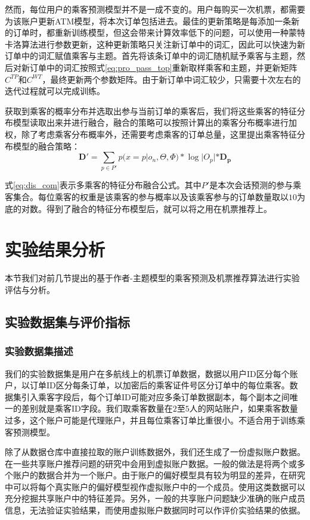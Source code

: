 然而，每位用户的乘客预测模型并不是一成不变的。用户每购买一次机票，都需要为该账户更新ATM模型，将本次订单包括进去。最佳的更新策略是每添加一条新的订单时，都重新训练模型，但这会带来计算效率低下的问题，可以使用一种蒙特卡洛算法进行参数更新，这种更新策略只关注新订单中的词汇，因此可以快速为新订单中的词汇赋值乘客与主题。首先将该条订单中的词汇随机赋予乘客与主题，然后对新订单中的词汇按照式\ref{eq:pro_pass_top}重新取样乘客和主题，并更新矩阵$C^{TP}$和$C^{WT}$，最终更新两个参数矩阵。由于新订单中词汇较少，只需要十次左右的迭代过程就可以完成训练。

获取到乘客的概率分布并选取出参与当前订单的乘客后，我们将这些乘客的特征分布模型读取出来并进行融合，融合的策略可以按照计算出的乘客分布概率进行加权，除了考虑乘客分布概率外，还需要考虑乘客的订单总量，这里提出乘客特征分布模型的融合策略：
\begin{equation}
	\label{eq:dis_com}
	\mathbf{D'} = \sum_{p \in P'} p(x = p|o_n,\Theta,\Phi) * \log |O_p| * \mathbf{D_p}
\end{equation}

式\ref{eq:dis_com}表示多乘客的特征分布融合公式。其中$P'$是本次会话预测的参与乘客集合。每位乘客的权重是该乘客的参与概率以及该乘客参与的订单数量取以$10$为底的对数。得到了融合的特征分布模型后，就可以将之用在机票推荐上。

\section{实验结果分析}

本节我们对前几节提出的基于作者-主题模型的乘客预测及机票推荐算法进行实验评估与分析。

\subsection{实验数据集与评价指标}

\subsubsection{实验数据集描述}
我们的实验数据集是用户在多航线上的机票订单数据，数据以用户ID区分每个账户，以订单ID区分每条订单，以加密后的乘客证件号区分订单中的每位乘客。数据集引入乘客字段后，每个订单ID可能对应多条订单数据副本，每个副本之间唯一的差别就是乘客ID字段。我们取乘客数量在$2$至$5$人的网站账户，如果乘客数量过多，这个账户可能是代理账户，并且每位乘客订单比重很小。不适合用于训练乘客预测模型。

除了从数据仓库中直接拉取的账户训练数据外，我们还生成了一份虚拟账户数据。在一些共享账户推荐问题的研究中会用到虚拟账户数据。一般的做法是将两个或多个账户的数据合并为一个账户。由于账户的偏好模型具有较为明显的差异，在研究中可以将每个真实账户的偏好模型视作虚拟账户中的一个成员。使用这类数据可以充分挖掘共享账户中的特征差异。另外，一般的共享账户问题缺少准确的账户成员信息，无法验证实验结果，而使用虚拟账户数据同时可以作评价实验结果的依据。

